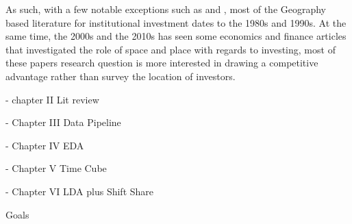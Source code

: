 As such, with a few notable exceptions such as \cite{Graves2003,gongthe2012} and \cite{GreenOLef2014}, most of the Geography based literature for institutional investment dates to the 1980s and 1990s.  At the same time, the 2000s and the 2010s has seen some economics and finance articles that investigated the role of space and place with regards to investing, most of these papers research question is more interested in drawing a competitive advantage rather than survey the location of investors.  







- chapter II Lit review

- Chapter III Data Pipeline

- Chapter IV EDA

- Chapter V Time Cube

- Chapter VI LDA plus Shift Share

Goals 